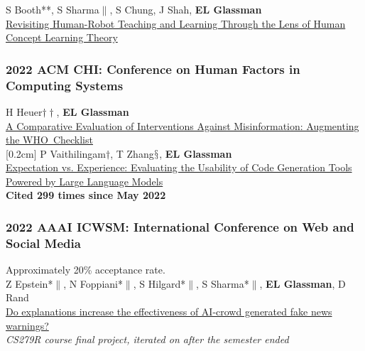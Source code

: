 \documentclass[10pt, a4paper]{article}
\newcommand{\years}[1]{\marginnote{\normalsize #1}}
\begin{document}
\years{\textbf{C25}}S Booth**, S Sharma$\|$, S Chung, J Shah, \textbf{EL Glassman}\\
\href{http://glassmanlab.seas.harvard.edu/papers/booth_hri2022.pdf}{Revisiting Human-Robot Teaching and Learning Through the Lens of Human Concept Learning Theory}
\subsubsection*{2022 ACM \textbf{CHI}: Conference on Human Factors in Computing Systems}

\years{\textbf{C24}}H Heuer$\dagger\dagger$, \textbf{EL Glassman}\\
\href{http://glassmanlab.seas.harvard.edu/papers/who_checklist_chi22.pdf}{A Comparative Evaluation of Interventions Against Misinformation: Augmenting the WHO~Checklist}\\
[0.2cm]
\years{\textbf{C23} LBW}P Vaithilingam$\dagger$, T Zhang$\mathsection$, \textbf{EL Glassman}\\
\href{http://glassmanlab.seas.harvard.edu/papers/chi2022-lbw-copilot.pdf}{Expectation vs. Experience: Evaluating the Usability of Code Generation Tools Powered by Large Language Models}\\
\textbf{Cited 299 times since May 2022}

\subsubsection*{2022 AAAI \textbf{ICWSM}: International Conference on Web and Social Media}
Approximately 20\% acceptance rate.\\

\years{\textbf{C22}}Z Epstein*$\|$, N Foppiani*$\|$, S Hilgard*$\|$, S Sharma*$\|$, \textbf{EL Glassman}, D Rand\\
\href{http://glassmanlab.seas.harvard.edu/papers/epsteinEtAl_CS279_icwsm.pdf}{Do explanations increase the effectiveness of AI-crowd generated fake news warnings?}\\
\textit{CS279R course final project, iterated on after the semester ended}
\end{document}
